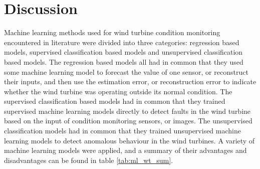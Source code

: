 \newpage
\chapter{Discussion} 

Machine learning methods used for wind turbine condition monitoring encountered in literature were divided into three categories: regression based models, supervised classification based models and unsupervised classification based models. 
The regression based models all had in common that they used some machine learning model to forecast the value of one sensor, or reconstruct their inputs, and then use the estimation error, or reconstruction error to indicate whether the wind turbine was operating outside its normal condition.
The supervised classification based models had in common that they trained supervised machine learning models directly to detect faults in the wind turbine based on the input of condition monitoring sensors, or images. 
The unsupervised classification models had in common that they trained unsupervised machine learning models to detect anomalous behaviour in the wind turbines. 
A variety of machine learning models were applied, and a summary of their advantages and disadvantages can be found in table \ref{tab:ml_wt_sum}. \bigskip

